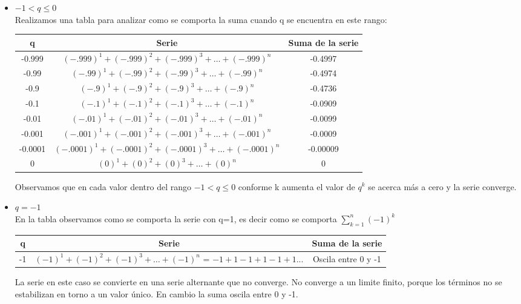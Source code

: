 \documentclass[12pt]{article}
\begin{document}
\begin{enumerate}
\begin{itemize}
    \item $-1< q \leq 0$ \\
    Realizamos una tabla para analizar como se comporta la suma cuando q se encuentra en este rango:
          \begin{table} [h]
            \begin{center}
                \begin{tabular}{| c | c | c |}\\ \hline
                    q &     Serie & Suma de la serie  \\ \hline
                    -0.999 &  $(-.999)^1 + (-.999)^2 + (-.999)^3 +\ldots+(-.999)^n$ &  -0.4997   \\ \hline
                    -0.99 &  $(-.99)^1 + (-.99)^2 + (-.99)^3 +\ldots+(-.99)^n$ &    -0.4974\\ \hline
                    -0.9& $(-.9)^1 + (-.9)^2 + (-.9)^3 +\ldots+(-.9)^n$ &  -0.4736    \\ \hline
                    -0.1 & $(-.1)^1 + (-.1)^2 + (-.1)^3 +\ldots+(-.1)^n$  &  -0.0909  \\ \hline
                    -0.01& $(-.01)^1 + (-.01)^2 + (-.01)^3 +\ldots+(-.01)^n$ &   -0.0099 \\ \hline
                    -0.001& $(-.001)^1 + (-.001)^2 + (-.001)^3 +\ldots+(-.001)^n$ &   -0.0009  \\ \hline
                    -0.0001 & $(-.0001)^1 + (-.0001)^2 + (-.0001)^3 +\ldots+(-.0001)^n$ &  -0.00009   \\ \hline
                    0 & $(0)^1 + (0)^2 + (0)^3 +\ldots+(0)^n$& 0    \\ \hline
                \end{tabular}

                \label{tab:datos}
            \end{center}
          \end{table}
Observamos que en cada valor dentro del rango $-1<q\leq 0$ conforme k aumenta el valor de $q^k$ se acerca más a cero y la serie converge.

    
    


    
    \item $q=-1$\\
    En la tabla observamos como se comporta la serie con q=1, es decir como se comporta $\sum_{k=1}^{n} (-1)^k $
    \begin{table} [H]
    \centering
\begin{tabular}{| c | c | c |}
\hline
q &     Serie & Suma de la serie  \\ \hline
 -1 & $(-1)^1 + (-1)^2 + (-1)^3 +\ldots+(-1)^n$ = $-1+1-1+1-1+1...$ & Oscila entre 0 y -1  \\ \hline
\end{tabular}
\label{tab:datos}
\end{table}
La serie en este caso se convierte en una serie alternante que no converge. No converge a un limite finito, porque los términos no se estabilizan en torno a un valor único. En cambio la suma oscila entre 0 y -1.



\end{itemize}
\end{enumerate}
\end{document}
